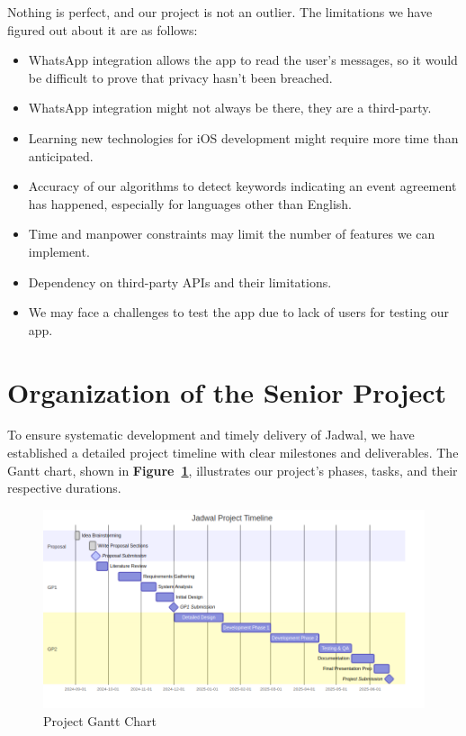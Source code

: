 Nothing is perfect, and our project is not an outlier. The limitations we have figured out about it are as follows:
\begin{itemize}
    \item WhatsApp integration allows the app to read the user's messages, so it would be difficult to prove that privacy hasn't been breached.
    \item WhatsApp integration might not always be there, they are a third-party.
    \item Learning new technologies for iOS development might require more time than anticipated.
    \item Accuracy of our algorithms to detect keywords indicating an event agreement has happened, especially for languages other than English.
    \item Time and manpower constraints may limit the number of features we can implement.
    \item Dependency on third-party APIs and their limitations.
    \item We may face a challenges to test the app due to lack of users for testing our app.
\end{itemize}

\section{Organization of the Senior Project}

To ensure systematic development and timely delivery of Jadwal, we have established a detailed project timeline with clear milestones and deliverables. The Gantt chart, shown in \textbf{Figure~\ref{fig:project-gantt-chart}}, illustrates our project's phases, tasks, and their respective durations.

\begin{figure}[!h]
    \centering
    \includegraphics[width=\textwidth]{images/gantt.png}
    \caption{Project Gantt Chart}
    \label{fig:project-gantt-chart}
\end{figure}

